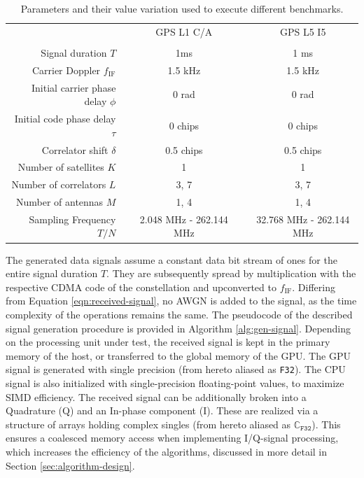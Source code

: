 \documentclass{juliacon}
\begin{document}
\begin{table}[h]
    \centering
    \caption{\label{tab:params} Parameters and their value variation used to execute different benchmarks.}
    \begin{tabular}{rlclc}
                                       &  & GPS    L1 C/A           &  & GPS   L5 I5               \\ 
    \cline{3-3}\cline{5-5}
    \multicolumn{1}{l}{}               &  & \multicolumn{1}{l}{}    &  & \multicolumn{1}{l}{}      \\
    Signal duration $T$                &  & 1ms                     &  & 1 ms                      \\
    Carrier Doppler $f_\mathrm{IF}$    &  & 1.5 kHz                 &  & 1.5 kHz                   \\
    Initial carrier phase delay $\phi$ &  & 0 rad                   &  & 0 rad                     \\
    Initial code phase delay $\tau$    &  & 0 chips                 &  & 0 chips                   \\
    Correlator shift $\delta$          &  & 0.5 chips               &  & 0.5 chips                 \\
    Number of satellites $K$           &  & 1                    &  & 1               \\      
    Number of correlators $L$          &  & 3, 7                &  & 3, 7                 \\
    Number of antennas $M$             &  & 1, 4                &  & 1, 4                 \\
    Sampling Frequency $T/N$           &  & 2.048 MHz - 262.144 MHz &  & 32.768 MHz - 262.144 MHz 

    \end{tabular}
\end{table}
The generated data signals assume a constant data bit stream of ones for the entire signal duration $T$. They are subsequently spread by multiplication with the respective CDMA code of the constellation and upconverted to $f_{\mathrm{IF}}$. Differing from Equation \ref{eqn:received-signal}, no AWGN is added to the signal, as the time complexity of the operations remains the same. The pseudocode of the described signal generation procedure is provided in Algorithm \ref{alg:gen-signal}. Depending on the processing unit under test, the received signal is kept in the primary memory of the host, or transferred to the global memory of the GPU. The GPU signal is generated with single precision (from hereto aliased as \texttt{F32}). The CPU signal is also initialized with single-precision floating-point values, to maximize SIMD efficiency. The received signal can be additionally broken into a Quadrature (Q) and an In-phase component (I). These are realized via a structure of arrays holding complex singles (from hereto aliased as $\mathbb{C}_{\texttt{F32}}$). This ensures a coalesced memory access when implementing I/Q-signal processing, which increases the efficiency of the algorithms, discussed in more detail in Section \ref{sec:algorithm-design}.
\end{document}
